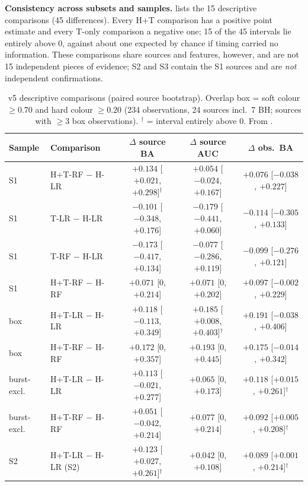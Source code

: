 \textbf{Consistency across subsets and samples.} \Descriptive{}  lists the 15 descriptive
comparisons (45 differences). Every H+T comparison has a positive point estimate and every T-only comparison a negative
one; 15 of the 45 intervals lie entirely above 0, against about one expected by chance if timing carried no information.
These comparisons share sources and features, however, and are not 15 independent pieces of evidence; S2 and S3 contain
the S1 sources and are \emph{not} independent confirmations.

\begin{table}[htbp]
\centering\footnotesize
\caption[v5 descriptive comparisons]{\Descriptive{} v5 descriptive comparisons (paired source bootstrap). Overlap box =
soft colour $\ge0.70$ and hard colour $\ge0.20$ (234 observations, 24 sources incl.\ 7 BH; sources with $\ge3$ box
observations). $^\dagger$ = interval entirely above 0. From .}
\label{tab:p3v5desc}
\scriptsize\setlength{\tabcolsep}{3pt}
\begin{tabular}{@{}llccc@{}}
\toprule
Sample & Comparison & $\Delta$ source BA & $\Delta$ source AUC & $\Delta$ obs.\ BA \\
\midrule
S1 & H+T-RF $-$ H-LR & $+0.134$ [$+0.021$, $+0.298$]$^\dagger$ & $+0.054$ [$-0.024$, $+0.167$] & $+0.076$ [$-0.038$, $+0.227$] \\
S1 & T-LR $-$ H-LR & $-0.101$ [$-0.348$, $+0.176$] & $-0.179$ [$-0.441$, $+0.060$] & $-0.114$ [$-0.305$, $+0.133$] \\
S1 & T-RF $-$ H-LR & $-0.173$ [$-0.417$, $+0.134$] & $-0.077$ [$-0.286$, $+0.119$] & $-0.099$ [$-0.276$, $+0.121$] \\
S1 & H+T-RF $-$ H-RF & $+0.071$ [0, $+0.214$] & $+0.071$ [0, $+0.202$] & $+0.097$ [$-0.002$, $+0.229$] \\
box & H+T-LR $-$ H-LR & $+0.118$ [$-0.113$, $+0.349$] & $+0.185$ [$+0.008$, $+0.403$]$^\dagger$ & $+0.191$ [$-0.038$, $+0.406$] \\
box & H+T-RF $-$ H-RF & $+0.172$ [0, $+0.357$] & $+0.193$ [0, $+0.445$] & $+0.175$ [$-0.014$, $+0.342$] \\
burst-excl. & H+T-LR $-$ H-LR & $+0.113$ [$-0.021$, $+0.277$] & $+0.065$ [0, $+0.173$] & $+0.118$ [$+0.015$, $+0.261$]$^\dagger$ \\
burst-excl. & H+T-RF $-$ H-RF & $+0.051$ [$-0.042$, $+0.214$] & $+0.077$ [0, $+0.214$] & $+0.092$ [$+0.005$, $+0.208$]$^\dagger$ \\
S2 & H+T-LR $-$ H-LR (S2) & $+0.123$ [$+0.027$, $+0.261$]$^\dagger$ & $+0.042$ [0, $+0.108$] & $+0.089$ [$+0.001$, $+0.214$]$^\dagger$ \\

\end{tabular}
\end{table}
